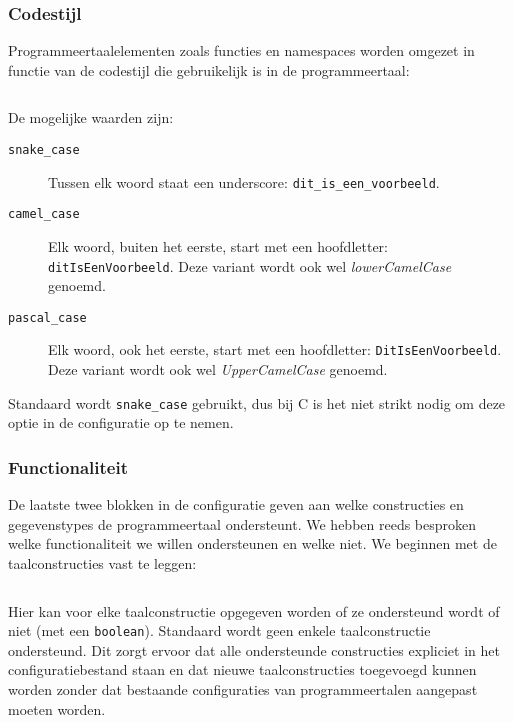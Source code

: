 \inputminted[firstline=2,lastline=14,gobble=2]{js}{sources/c-config.json}

\subsubsection{Codestijl}

Programmeertaalelementen zoals functies en namespaces worden omgezet in functie van de codestijl die gebruikelijk is in de programmeertaal:

\inputminted[firstline=15,lastline=18,gobble=2]{js}{sources/c-config.json}

De mogelijke waarden zijn:

\begin{description}
    \item[\texttt{snake\_case}] Tussen elk woord staat een underscore: \texttt{dit\_is\_een\_voorbeeld}.
    \item[\texttt{camel\_case}] Elk woord, buiten het eerste, start met een hoofdletter: \texttt{ditIsEenVoorbeeld}.
    Deze variant wordt ook wel \emph{lowerCamelCase} genoemd.
    \item[\texttt{pascal\_case}] Elk woord, ook het eerste, start met een hoofdletter: \texttt{DitIsEenVoorbeeld}.
    Deze variant wordt ook wel \emph{UpperCamelCase} genoemd.
\end{description}

Standaard wordt \texttt{snake\_case} gebruikt, dus bij C is het niet strikt nodig om deze optie in de configuratie op te nemen.

\subsubsection{Functionaliteit}

De laatste twee blokken in de configuratie geven aan welke constructies en gegevenstypes de programmeertaal ondersteunt.
We hebben reeds besproken welke functionaliteit we willen ondersteunen en welke niet.
We beginnen met de taalconstructies vast te leggen:

\inputminted[firstline=19,lastline=27,gobble=2]{js}{sources/c-config.json}

Hier kan voor elke taalconstructie opgegeven worden of ze ondersteund wordt of niet (met een \texttt{boolean}).
Standaard wordt geen enkele taalconstructie ondersteund.
Dit zorgt ervoor dat alle ondersteunde constructies expliciet in het configuratiebestand staan en dat nieuwe taalconstructies toegevoegd kunnen worden zonder dat bestaande configuraties van programmeertalen aangepast moeten worden.

